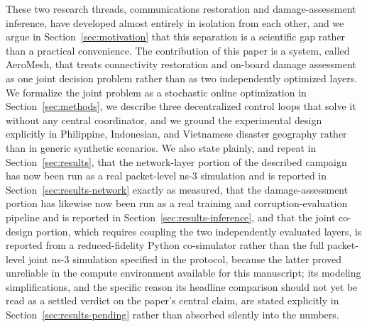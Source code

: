 \documentclass[drones,article,submit,moreauthors]{Definitions/mdpi}
\begin{document}
These two research threads, communications restoration and damage-assessment inference, have developed almost entirely in isolation from each other, and we argue in Section~\ref{sec:motivation} that this separation is a scientific gap rather than a practical convenience. The contribution of this paper is a system, called AeroMesh, that treats connectivity restoration and on-board damage assessment as one joint decision problem rather than as two independently optimized layers. We formalize the joint problem as a stochastic online optimization in Section~\ref{sec:methods}, we describe three decentralized control loops that solve it without any central coordinator, and we ground the experimental design explicitly in Philippine, Indonesian, and Vietnamese disaster geography rather than in generic synthetic scenarios. We also state plainly, and repeat in Section~\ref{sec:results}, that the network-layer portion of the described campaign has now been run as a real packet-level ns-3 simulation and is reported in Section~\ref{sec:results-network} exactly as measured, that the damage-assessment portion has likewise now been run as a real training and corruption-evaluation pipeline and is reported in Section~\ref{sec:results-inference}, and that the joint co-design portion, which requires coupling the two independently evaluated layers, is reported from a reduced-fidelity Python co-simulator rather than the full packet-level joint ns-3 simulation specified in the protocol, because the latter proved unreliable in the compute environment available for this manuscript; its modeling simplifications, and the specific reason its headline comparison should not yet be read as a settled verdict on the paper's central claim, are stated explicitly in Section~\ref{sec:results-pending} rather than absorbed silently into the numbers.
\end{document}
